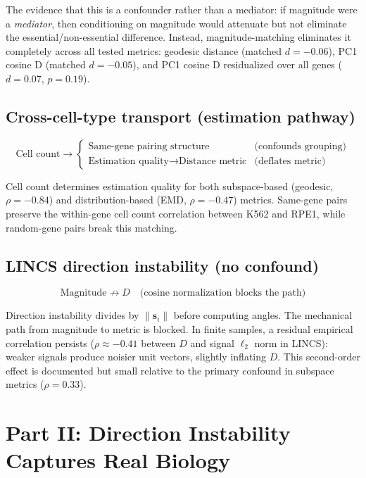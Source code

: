 \documentclass[11pt]{article}
\begin{document}
The evidence that this is a confounder rather than a mediator: if
magnitude were a \emph{mediator}, then conditioning on
magnitude would attenuate but not eliminate the essential/non-essential
difference. Instead, magnitude-matching eliminates it completely across
all tested metrics: geodesic distance (matched $d = -0.06$), PC1 cosine
D (matched $d = -0.05$), and PC1 cosine D residualized over all genes
($d = 0.07$, $p = 0.19$).

\subsection{Cross-cell-type transport (estimation pathway)}

\begin{equation*}
\text{Cell count} \rightarrow
\begin{cases}
\text{Same-gene pairing structure} & \text{(confounds grouping)} \\
\text{Estimation quality} \rightarrow \text{Distance metric}
  & \text{(deflates metric)}
\end{cases}
\end{equation*}

Cell count determines estimation quality for both subspace-based
(geodesic, $\rho = -0.84$) and distribution-based (EMD, $\rho = -0.47$)
metrics. Same-gene pairs preserve the within-gene cell count correlation
between K562 and RPE1, while random-gene pairs break this matching.

\subsection{LINCS direction instability (no confound)}

\begin{equation*}
\text{Magnitude} \not\rightarrow D \quad \text{(cosine normalization
blocks the path)}
\end{equation*}

Direction instability divides by $\|\mathbf{s}_i\|$ before computing
angles. The mechanical path from magnitude to metric is blocked.
In finite samples, a residual empirical correlation persists ($\rho
\approx -0.41$ between $D$ and signal $\ell_2$ norm in LINCS): weaker
signals produce noisier unit vectors, slightly inflating $D$. This
second-order effect is documented but small relative to the primary
confound in subspace metrics ($\rho = 0.33$).


\section{Part II: Direction Instability Captures Real Biology}
\end{document}
